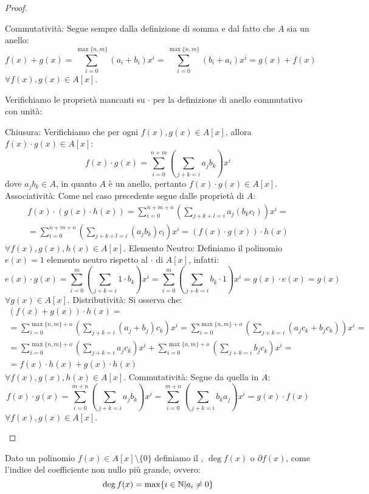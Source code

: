 \documentclass[11pt]{scrartcl}
\begin{document}
\begin{proof}
\begin{enumerate}[(a)]
	\ii Commutatività: Segue sempre dalla definizione di somma e dal fatto che $A$ sia un anello:
		\[  f(x)+g(x) = \sum_{i=0}^{\max\{n,m\}} (a_i+b_i)x^i =\sum_{i=0}^{\max\{n,m\}} (b_i+a_i)x^i = g(x) + f(x)
		\]
		$\forall f(x),g(x) \in A[x]$.
	\end{enumerate}
Verifichiamo le proprietà mancanti su $\cdot$ per la definizione di anello commutativo con unità:
	\begin{enumerate}[(a)]
	\ii Chiusura: Verifichiamo che per ogni $f(x), g(x) \in A[x]$, allora $f(x) \cdot g(x) \in A[x]$:
		\[ f(x) \cdot g(x) = \sum_{i=0}^{n+m}\left(\sum_{j+k=i}a_jb_k\right)x^i
		\]
		dove $a_jb_k \in A$, in quanto $A$ è un anello, pertanto $f(x) \cdot g(x) \in A[x]$.
	\ii Associatività: Come nel caso precedente segue dalle proprietà di $A$:
		\begin{multline*}
		f(x) \cdot (g(x) \cdot h(x)) = \sum_{i=0}^{n+m+o}\left(\sum_{j+k+l=i}a_j(b_kc_l)\right) x^i = \\
		=\sum_{i=0}^{n+m+o}\left(\sum_{j+k+l=i}(a_jb_k)c_l\right) x^ i  =  (f(x) \cdot g(x)) \cdot h(x)
		\end{multline*}
		$\forall f(x),g(x),h(x) \in A[x]$.
	\ii Elemento Neutro: Definiamo il polinomio $e(x)=1$ elemento neutro rispetto al $\cdot$ di $A[x]$, infatti:
		\[ e(x) \cdot g(x) = \sum_{i=0}^{m}\left(\sum_{j+k=i} 1\cdot b_k\right)x^i  = \sum_{i=0}^{m}\left(\sum_{j+k=i} b_k\cdot 1\right)x^i = g(x) \cdot e(x) = g(x)
		\]
		$\forall g(x) \in A[x]$.
	\ii Distributività: Si osserva che:
		\begin{multline*}
		(f(x)+g(x)) \cdot h(x) =\\
		= \sum_{i=0}^{\max\{n,m\}+o}\left(\sum_{j+k=i} (a_j+b_j)c_k\right)x^i 
		= \sum_{i=0}^{\max\{n,m\}+o}\left(\sum_{j+k=i} (a_jc_k+b_jc_k)\right)x^i = \\
		= \sum_{i=0}^{\max\{n,m\}+o}\left(\sum_{j+k=i} a_jc_k\right)x^i +\sum_{i=0}^{\max\{n,m\}+o}\left(\sum_{j+k=i} b_jc_k\right)x^i =\\
		= f(x) \cdot h(x) + g(x) \cdot h(x)
		\end{multline*}
		$\forall f(x),g(x),h(x) \in A[x]$.
	\ii Commutatività: Segue da quella in $A$:
		\[ f(x) \cdot g(x) = \sum_{i=0}^{m+n}\left(\sum_{j+k=i} a_jb_k\right)x^i = \sum_{i=0}^{m+n}\left(\sum_{j+k=i} b_ka_j\right)x^i = g(x) \cdot f(x)
		\]
		$\forall f(x),g(x) \in A[x]$.
	\end{enumerate}
\end{proof}

\begin{definition}
Dato un polinomio $f(x) \in A[x] \setminus \{0\}$ definiamo il , $\deg f(x)$ o $\partial f(x)$, come l'indice del coefficiente non nullo più grande, ovvero:
	\[ \deg f(x) = \max\{i \in \mathbb N | a_i \neq 0\}
	\]
\end{definition}
\end{document}
